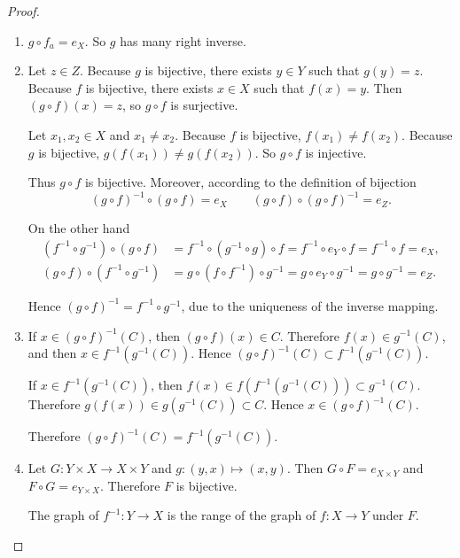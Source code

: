 \begin{proof}
    \begin{enumerate}[label={(\alph*)}]
        \item $g\circ f_{a} = e_{X}$. So $g$ has many right inverse.
        \item Let $z\in Z$. Because $g$ is bijective, there exists $y\in Y$ such that $g(y) = z$. Because $f$ is bijective, there exists $x\in X$ such that $f(x) = y$. Then $(g\circ f)(x) = z$, so $g\circ f$ is surjective.

              Let $x_{1}, x_{2}\in X$ and $x_{1}\ne x_{2}$. Because $f$ is bijective, $f(x_{1})\ne f(x_{2})$. Because $g$ is bijective, $g(f(x_{1}))\ne g(f(x_{2}))$. So $g\circ f$ is injective.

              Thus $g\circ f$ is bijective. Moreover, according to the definition of bijection
              \[
                  {(g\circ f)}^{-1} \circ (g\circ f) = e_{X}\qquad (g\circ f)\circ {(g\circ f)}^{-1} = e_{Z}.
              \]

              On the other hand
              \begin{align*}
                  (f^{-1}\circ g^{-1})\circ (g\circ f) & = f^{-1}\circ (g^{-1}\circ g)\circ f = f^{-1} \circ e_{Y} \circ f = f^{-1}\circ f = e_{X}, \\
                  (g\circ f)\circ (f^{-1}\circ g^{-1}) & = g\circ (f\circ f^{-1})\circ g^{-1} = g\circ e_{Y} \circ g^{-1} = g\circ g^{-1} = e_{Z}.
              \end{align*}

              Hence ${(g\circ f)}^{-1} = f^{-1}\circ g^{-1}$, due to the uniqueness of the inverse mapping.
        \item If $x\in {(g\circ f)}^{-1}(C)$, then $(g\circ f)(x)\in C$. Therefore  $f(x)\in g^{-1}(C)$, and then $x\in f^{-1}(g^{-1}(C))$. Hence ${(g\circ f)}^{-1}(C)\subset f^{-1}(g^{-1}(C))$.

              If $x\in f^{-1}(g^{-1}(C))$, then $f(x)\in f(f^{-1}(g^{-1}(C)))\subset g^{-1}(C)$. Therefore $g(f(x))\in g(g^{-1}(C))\subset C$. Hence $x\in {(g\circ f)}^{-1}(C)$.

              Therefore ${(g\circ f)}^{-1}(C) = f^{-1}(g^{-1}(C))$.
        \item Let $G: Y\times X\to X\times Y$ and $g: (y, x)\mapsto (x, y)$. Then $G\circ F = e_{X\times Y}$ and $F\circ G = e_{Y\times X}$. Therefore $F$ is bijective.

              The graph of $f^{-1}: Y\to X$ is the range of the graph of $f: X\to Y$ under $F$.
    \end{enumerate}
\end{proof}
\newpage

